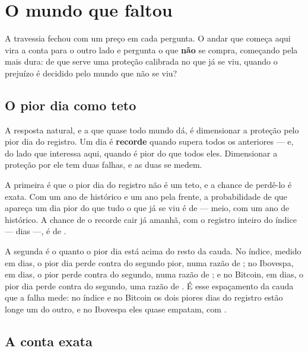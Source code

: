\chapter{O mundo que faltou}\label{cap:faltou}

A travessia fechou com um preço em cada pergunta. O andar que começa aqui vira a conta para o outro
lado e pergunta o que \textbf{não} se compra, começando pela mais dura: de que serve uma proteção
calibrada no que já se viu, quando o prejuízo é decidido pelo mundo que não se viu?

\section{O pior dia como teto}

A resposta natural, e a que quase todo mundo dá, é dimensionar a proteção pelo pior dia do registro.
Um dia é \textbf{recorde} quando supera todos os anteriores --- e, do lado que interessa aqui,
quando é pior do que todos eles. Dimensionar a proteção por ele tem duas falhas, e as duas se
medem.

A primeira é que o pior dia do registro não é um teto, e a chance
de perdê-lo é exata. Com um ano de
histórico e um ano pela frente, a probabilidade de que apareça um dia pior do que tudo o que já se
viu é de \numRecordeProbabilidade{} --- meio, com um ano de histórico. A chance de o recorde cair já
amanhã, com o registro inteiro do índice --- \numRecordeIndiceDias{} dias ---, é de
\numRecordeDoProximo{}.

A segunda é o quanto o pior dia está acima do resto da cauda. No índice, medido em \numRecordeIndiceDias{} dias, o pior dia perde \numRecordeIndicePior{} contra
\numRecordeIndiceSegundo{} do segundo pior, numa razão de \numRecordeIndiceRazao{}; no Ibovespa, em
\numRecordeIbovespaDias{} dias, o pior perde \numRecordeIbovespaPior{} contra
\numRecordeIbovespaSegundo{} do segundo, numa razão de \numRecordeIbovespaRazao{}; e no Bitcoin, em
\numRecordeBitcoinDias{} dias, o pior dia perde \numRecordeBitcoinPior{} contra
\numRecordeBitcoinSegundo{} do segundo, uma razão de \numRecordeBitcoinRazao{}. É esse espaçamento da cauda que a falha mede: no
índice e no Bitcoin os dois piores dias do registro estão longe um do outro, e no Ibovespa eles quase
empatam, com \numRecordeIbovespaRazao{}.

\section{A conta exata}

